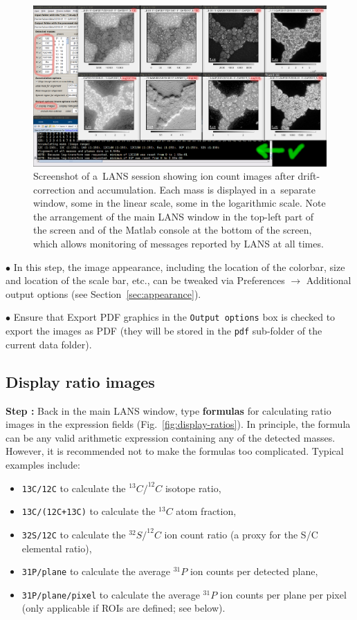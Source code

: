 \documentclass[a4paper, 11pt]{article}
\newcommand{\ttt}[1]{\texttt{#1}}
\newcommand{\lans}[1]{{\color{magenta}#1}}
\newcommand{\lanscb}[1]{{\color{darkgreen}#1}}
\newcommand{\lanstf}[1]{{\color{cyan}#1}}
\newcommand\ra{\rightarrow}
\newcounter{step}
\newcommand\s{\addtocounter{step}{1}\vskip5pt\noindent\textbf{Step \thestep:}{ }}
\newcommand\bul{\vskip5pt\noindent$\bullet${ }}
\newcommand\bb[1]{\textbf{#1}}
\begin{document}
\begin{figure}[!ht]
\centering
\includegraphics[width=\textwidth]{figs3/LANS-display-masses}
\caption{\label{fig:display-masses}%
Screenshot of a~LANS session showing ion count images after drift-correction and accumulation. Each mass is displayed in a~separate window, some in the linear scale, some in the logarithmic scale. Note the arrangement of the main LANS window in the top-left part of the screen and of the Matlab console at the bottom of the screen, which allows monitoring of messages reported by LANS at all times.}
\end{figure}

\bul In this step, the image appearance, including the location of the colorbar, size and location of the scale bar, etc., can be tweaked via \lans{Preferences} $\ra$ \lans{Additional output options} (see Section~\ref{sec:appearance}). 

\bul Ensure that \lanscb{Export PDF graphics} in the \ttt{Output options} box is checked to export the images as PDF (they will be stored in the \ttt{pdf} sub-folder of the current data folder).


\subsection{Display ratio images}
\setcounter{step}{0}

\s Back in the main LANS window, type \bb{formulas} for calculating ratio images in the  \lanstf{expression} fields (Fig.~\ref{fig:display-ratios}). In principle, the formula can be any valid arithmetic expression containing any of the detected masses. However, it is recommended not to make the formulas too complicated. Typical examples include:

\begin{itemize}
\item \ttt{13C/12C} to calculate the $^{13}C/^{12}C$ isotope ratio,
\item \ttt{13C/(12C+13C)} to calculate the $^{13}C$ atom fraction,
\item \ttt{32S/12C} to calculate the $^{32}S/^{12}C$ ion count ratio (a proxy for the S/C elemental ratio), 
\item \ttt{31P/plane} to calculate the average $^{31}P$ ion counts per detected plane, 
\item \ttt{31P/plane/pixel} to calculate the average $^{31}P$ ion counts per plane per pixel (only applicable if ROIs are defined; see below).
\end{itemize}
\end{document}
